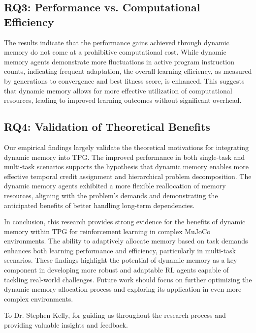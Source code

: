 \documentclass[sigconf]{acmart}
\begin{document}
\subsection{RQ3: Performance vs. Computational Efficiency}
The results indicate that the performance gains achieved through dynamic memory do not come at a 
prohibitive computational cost. While dynamic memory agents demonstrate more fluctuations in active 
program instruction counts, indicating frequent adaptation, the overall learning efficiency, as measured 
by generations to convergence and best fitness score, is enhanced. This suggests that dynamic memory 
allows for more effective utilization of computational resources, leading to improved learning outcomes without significant overhead.

\subsection{RQ4: Validation of Theoretical Benefits}
Our empirical findings largely validate the theoretical motivations 
for integrating dynamic memory into TPG. The improved performance in both single-task and multi-task scenarios supports 
the hypothesis that dynamic memory enables more effective temporal credit assignment and hierarchical problem decomposition. 
The dynamic memory agents exhibited a more flexible reallocation of memory resources, aligning with the problem's demands 
and demonstrating the anticipated benefits of better handling long-term dependencies.

In conclusion, this research provides strong evidence for the benefits of dynamic memory within TPG for reinforcement 
learning in complex MuJoCo environments. The ability to adaptively allocate memory based on task demands enhances both 
learning performance and efficiency, particularly in multi-task scenarios. These findings highlight the potential of 
dynamic memory as a key component in developing more robust and adaptable RL agents capable of tackling real-world challenges. 
Future work should focus on further optimizing the dynamic memory allocation process and exploring its application 
in even more complex environments.

\begin{acks}
To Dr. Stephen Kelly, for guiding us throughout the research process and providing valuable insights and feedback.
\end{acks}
\end{document}
